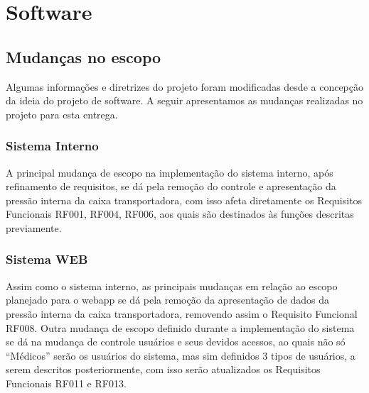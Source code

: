\section{Software}

\subsection{Mudanças no escopo}
	Algumas informações e diretrizes do projeto foram modificadas desde a concepção da ideia do projeto de software. A seguir apresentamos as mudanças realizadas no projeto para esta entrega.

\subsubsection{Sistema Interno}
	A principal mudança de escopo na implementação do sistema interno, após refinamento de requisitos, se dá pela remoção do controle e apresentação da pressão interna da caixa transportadora, com isso afeta diretamente os Requisitos Funcionais RF001, RF004, RF006, aos quais são destinados às funções descritas previamente.

\subsubsection{Sistema WEB}
	Assim como o sistema interno, as principais mudanças em relação ao escopo planejado para o webapp se dá pela remoção da apresentação de dados da pressão interna da caixa transportadora, removendo assim o Requisito Funcional RF008.
	Outra mudança de escopo definido durante a implementação do sistema se dá na mudança de controle usuários e seus devidos acessos, ao quais não só “Médicos” serão os usuários do sistema, mas sim definidos 3 tipos de usuários, a serem descritos posteriormente, com isso serão atualizados os Requisitos Funcionais RF011 e RF013.

